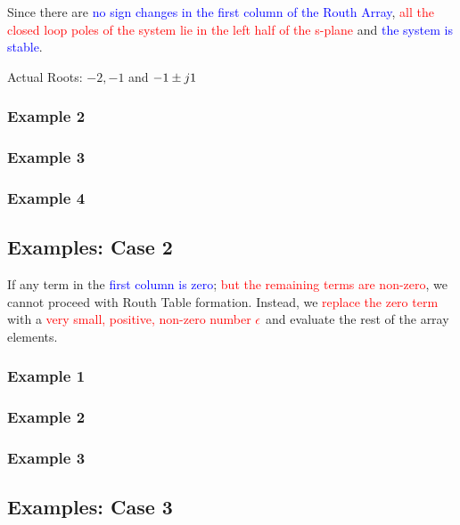\documentclass[
  14pt,
  a4paper,
  oneside,
  open=any,
  a4paper,
  14pt]{report}
\begin{document}
Since there are \textcolor{blue}{no sign changes in the first column of
the Routh Array}, \textcolor{red}{all the closed loop poles of the
system lie in the left half of the s-plane} and \textcolor{blue}{the
system is stable}.

Actual Roots: \(-2, -1\) and
\(\complexnum[output-complex-root = j, complex-root-position = before-number, print-complex-unity]{-1\pm j}\)

\subsubsection{Example 2}\label{example-2}

\subsubsection{Example 3}\label{example-3}

\subsubsection{Example 4}\label{example-4}

\subsection{Examples: Case 2}\label{examples-case-2}

If any term in the \textcolor{blue}{first column is zero};
\textcolor{red}{but the remaining terms are non-zero}, we cannot proceed
with Routh Table formation. Instead, we \textcolor{red}{replace the zero
term} with a \textcolor{red}{very small, positive, non-zero number}
\(\textcolor{red}{\epsilon}\) and evaluate the rest of the array
elements.

\subsubsection{Example 1}\label{example-1-2}

\subsubsection{Example 2}\label{example-2-1}

\subsubsection{Example 3}\label{example-3-1}

\subsection{Examples: Case 3}\label{examples-case-3}
\end{document}
